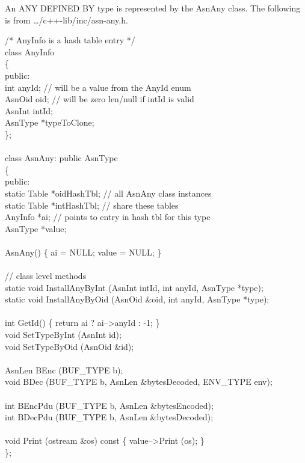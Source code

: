 An ANY DEFINED BY type is represented by the {\C AsnAny} class.
The following is from {\ufn \dots/c++-lib/inc/asn-any.h}.
\begin{Ccode}
/* AnyInfo is a hash table entry */\\
class AnyInfo\\
\{\\
public:\+\\
  int				\>\>anyId;  // will be a value from the AnyId enum\\
  AsnOid			\>\>oid;    // will be zero len/null if intId is valid\\
  AsnInt			\>\>intId;\\
  AsnType			\>\>*typeToClone;\-\\
\};\\
\\
class AsnAny: public AsnType\\
\{\\
public:\+\\
  static Table			\>\>*oidHashTbl;  // all AsnAny class instances\\
  static Table			\>\>*intHashTbl;  // share these tables\\
  AnyInfo			\>\>*ai; // points to entry in hash tbl for this type\\
  AsnType			\>\>*value;\\
\\
				\>\>AsnAny() \{ ai = NULL; value = NULL; \}\\
\\
  // class level methods\\
  static void			\>\>InstallAnyByInt (AsnInt intId, int anyId, AsnType *type);\\
  static void			\>\>InstallAnyByOid (AsnOid \&oid, int anyId, AsnType *type);\\
\\
  int				\>\>GetId() \{ return ai ? ai-->anyId : -1; \}\\
  void				\>\>SetTypeByInt (AsnInt id);\\
  void				\>\>SetTypeByOid (AsnOid \&id);\\
\\
  AsnLen			\>\>BEnc (BUF\_TYPE b);\\
  void				\>\>BDec (BUF\_TYPE b, AsnLen \&bytesDecoded, ENV\_TYPE env);\\
\\
  int				\>\>BEncPdu (BUF\_TYPE b, AsnLen \&bytesEncoded);\\
  int				\>\>BDecPdu (BUF\_TYPE b, AsnLen \&bytesDecoded);\\
\\
  void				\>\>Print (ostream \&os) const \{ value-->Print (os); \}\\
\<\};
\end{Ccode}

